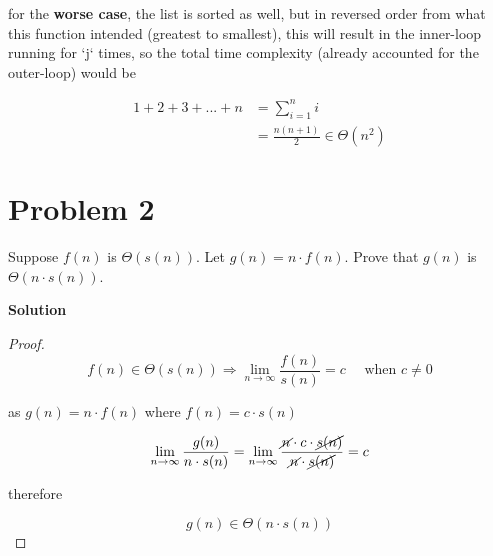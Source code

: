 \documentclass{article}
\newcommand{\solution}{\textbf{\large Solution}}
\theoremstyle{remark}
\begin{document}
\vspace{1em}

for the \textbf{worse case}, the list is sorted as well, but in reversed order from what this function intended (greatest to smallest), this will result in the inner-loop running for `j` times, so the total time complexity (already accounted for the outer-loop) would be 

\begin{align*}
    1 + 2 + 3 + ... + n &= \sum_{i=1}^n i \\
    &= \frac{n(n+1)}{2} \in \boxed{\Theta(n^2)}
\end{align*}

\vspace{1em}
\hrulefill

\section*{Problem 2}

Suppose $f(n)$ is $\Theta(s(n))$. Let $g(n) = n \cdot f(n)$. Prove that $g(n)$ is $\Theta(n \cdot s(n))$.

\medskip
\solution

\begin{proof}

\[f(n) \in \Theta(s(n)) \Rightarrow \lim_{n\rightarrow\infty} \frac{f(n)}{s(n)} = c \quad \text{ when } c \ne 0\]

as $g(n) = n \cdot f(n)$ where $f(n) = c \cdot s(n)$

\[
\lim_{n\rightarrow\infty} \frac{g(n)}{n \cdot s(n)}
=
\lim_{n\rightarrow\infty}
\frac{\cancel{n} \cdot c \cdot \cancel{s(n)}}{\cancel{n} \cdot \cancel{s(n)}} = c
\]

therefore

\[g(n) \in \Theta(n \cdot s(n))\]

\end{proof}

\vspace{1em}
\hrulefill
\end{document}

